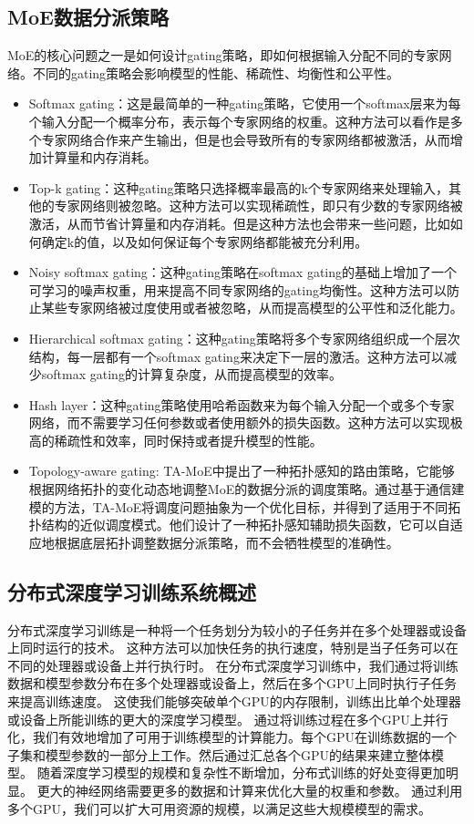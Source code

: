 \subsection{MoE数据分派策略}
MoE的核心问题之一是如何设计gating策略，即如何根据输入分配不同的专家网络。不同的gating策略会影响模型的性能、稀疏性、均衡性和公平性。
\begin{itemize}
    \item Softmax gating：这是最简单的一种gating策略，它使用一个softmax层来为每个输入分配一个概率分布，表示每个专家网络的权重。这种方法可以看作是多个专家网络合作来产生输出，但是也会导致所有的专家网络都被激活，从而增加计算量和内存消耗。
    \item Top-k gating：这种gating策略只选择概率最高的k个专家网络来处理输入，其他的专家网络则被忽略。这种方法可以实现稀疏性，即只有少数的专家网络被激活，从而节省计算量和内存消耗。但是这种方法也会带来一些问题，比如如何确定k的值，以及如何保证每个专家网络都能被充分利用。
    \item Noisy softmax gating：这种gating策略在softmax gating的基础上增加了一个可学习的噪声权重，用来提高不同专家网络的gating均衡性。这种方法可以防止某些专家网络被过度使用或者被忽略，从而提高模型的公平性和泛化能力。
    \item Hierarchical softmax gating：这种gating策略将多个专家网络组织成一个层次结构，每一层都有一个softmax gating来决定下一层的激活。这种方法可以减少softmax gating的计算复杂度，从而提高模型的效率。
    \item Hash layer：这种gating策略使用哈希函数来为每个输入分配一个或多个专家网络，而不需要学习任何参数或者使用额外的损失函数。这种方法可以实现极高的稀疏性和效率，同时保持或者提升模型的性能。
    \item Topology-aware gating: TA-MoE中提出了一种拓扑感知的路由策略，它能够根据网络拓扑的变化动态地调整MoE的数据分派的调度策略。通过基于通信建模的方法，TA-MoE将调度问题抽象为一个优化目标，并得到了适用于不同拓扑结构的近似调度模式。他们设计了一种拓扑感知辅助损失函数，它可以自适应地根据底层拓扑调整数据分派策略，而不会牺牲模型的准确性。
\end{itemize}

\subsection{分布式深度学习训练系统概述}

分布式深度学习训练是一种将一个任务划分为较小的子任务并在多个处理器或设备上同时运行的技术。
% 
这种方法可以加快任务的执行速度，特别是当子任务可以在不同的处理器或设备上并行执行时。
% 
在分布式深度学习训练中，我们通过将训练数据和模型参数分布在多个处理器或设备上，然后在多个GPU上同时执行子任务来提高训练速度。
% 
这使我们能够突破单个GPU的内存限制，训练出比单个处理器或设备上所能训练的更大的深度学习模型。
% 
通过将训练过程在多个GPU上并行化，我们有效地增加了可用于训练模型的计算能力。每个GPU在训练数据的一个子集和模型参数的一部分上工作。然后通过汇总各个GPU的结果来建立整体模型。
% 
随着深度学习模型的规模和复杂性不断增加，分布式训练的好处变得更加明显。
% 
更大的神经网络需要更多的数据和计算来优化大量的权重和参数。
% 
通过利用多个GPU，我们可以扩大可用资源的规模，以满足这些大规模模型的需求。

